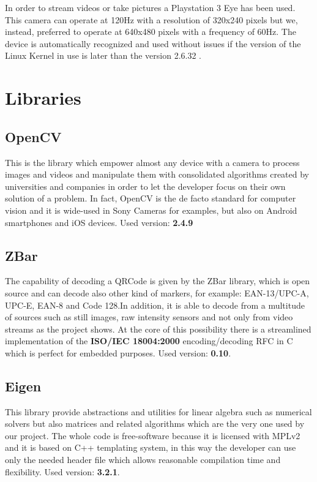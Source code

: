 In order to stream videos or take pictures a Playstation 3 Eye has been used.
This camera can operate at 120Hz with a resolution of 320x240 pixels but we, instead, preferred to operate at 640x480 pixels with a frequency of 60Hz.
The device is automatically recognized and used without issues if the version of the Linux Kernel in use is later than the version 2.6.32 .
 

\section{Libraries}

\subsection{OpenCV}
This is the library which empower almost any device with a camera to process images and videos and manipulate them with consolidated algorithms created by universities and companies in order to let the developer focus on their own solution of a problem.
In fact, OpenCV is the de facto standard for computer vision and it is wide-used in Sony Cameras for examples, but also on Android smartphones and iOS devices. 
\newline Used version: \textbf{2.4.9}

\subsection{ZBar}

The capability of decoding a QRCode is given by the ZBar library, which is open source and can decode also other kind of markers, for example: EAN-13/UPC-A, UPC-E, EAN-8 and Code 128.In addition, it is able to decode from a multitude of sources such as still images, raw intensity sensors and not only from video streams as the project shows. At the core of this possibility there is a streamlined implementation of the \textbf{ISO/IEC 18004:2000} encoding/decoding RFC in C which is perfect for embedded purposes.
\newline Used version: \textbf{0.10}.

\subsection{Eigen}
This library provide abstractions and utilities for linear algebra such as numerical solvers but also matrices and related algorithms which are the very one used by our project.
The whole code is free-software because it is licensed with MPLv2 and it is based on C++ templating system, in this way the developer can use only the needed header file which allows reasonable compilation time and flexibility.\cite{eigeninfo}
\newline Used version: \textbf{3.2.1}.
 
